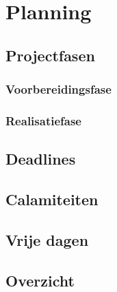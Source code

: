 \chapter{Planning}

\section{Projectfasen}
\subsection{Voorbereidingsfase}
\subsection{Realisatiefase}

\section{Deadlines}

\section{Calamiteiten}

\section{Vrije dagen}

\section{Overzicht}